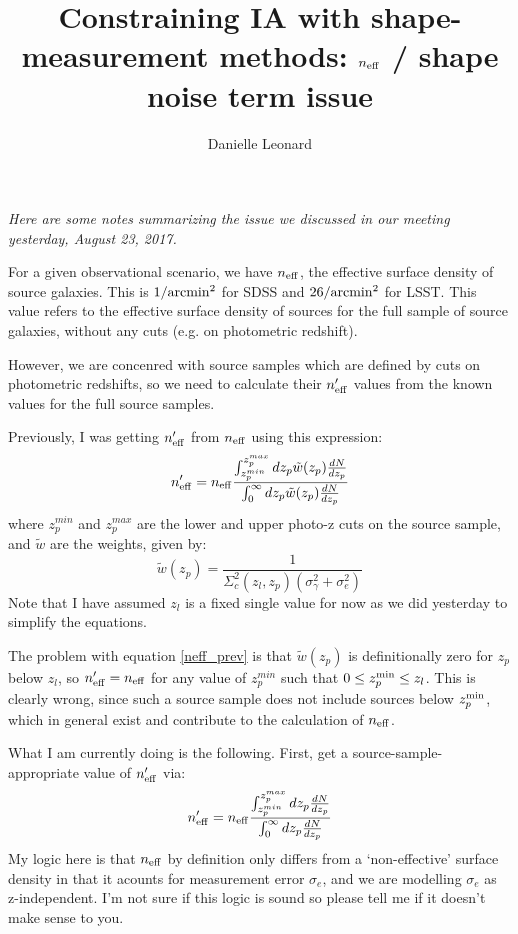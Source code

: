 \documentclass[onecolumn,amsmath,aps,fleqn, superscriptaddress]{revtex4}
\begin{document}
\title{Constraining IA with shape-measurement methods: $n_{\rm eff}$ / shape noise term issue}

\author{Danielle Leonard}

\maketitle

{\it Here are some notes summarizing the issue we discussed in our meeting yesterday, August 23, 2017.}

\vspace{2mm}

For a given observational scenario, we have $n_{\rm eff}$, the effective surface density of source galaxies. This is $1/{\rm arcmin}^2$ for SDSS and $26/{\rm arcmin}^2$ for LSST. This value refers to the effective surface density of sources for the full sample of source galaxies, without any cuts (e.g. on photometric redshift).

However, we are concenred with source samples which are defined by cuts on photometric redshifts, so we need to calculate their $n_{\rm eff}^\prime$ values from the known values for the full source samples.

Previously, I was getting $n_{\rm eff}^\prime$ from $n_{\rm eff}$ using this expression:
\begin{equation}
n_{\rm eff}^\prime = n_{\rm eff} \frac{\int_{z_p^{min}}^{z_p^{max}} dz_p \tilde{w}(z_p) \frac{dN}{dz_p}}{\int_{0}^{\infty} dz_p \tilde{w}(z_p) \frac{dN}{dz_p}}
\label{neff_prev}
\end{equation} 
where $z_p^{min}$ and $z_p^{max}$ are the lower and upper photo-z cuts on the source sample, and $\tilde{w}$ are the weights, given by:
\begin{equation}
\tilde{w}(z_p) = \frac{1}{\Sigma_c^2(z_l, z_p)(\sigma_\gamma^2 + \sigma_e^2)}
\label{weights}
\end{equation}
Note that I have assumed $z_l$ is a fixed single value for now as we did yesterday to simplify the equations.

The problem with equation \ref{neff_prev} is that $\tilde{w}(z_p)$ is definitionally zero for $z_p$ below $z_l$, so 
$n_{\rm eff}^\prime = n_{\rm eff}$ for any value of $z_p^{min}$ such that $0\le z_p^{\rm min}\le z_l$. This is clearly wrong, since such a source sample does not include sources below $z_p^{\rm min}$, which in general exist and contribute to the calculation of $n_{\rm eff}$.

What I am currently doing is the following. First, get a source-sample-appropriate value of $n_{\rm eff}^\prime$ via:
\begin{equation}
n_{\rm eff}^\prime = n_{\rm eff} \frac{\int_{z_p^{min}}^{z_p^{max}} dz_p \frac{dN}{dz_p}}{\int_{0}^{\infty} dz_p \frac{dN}{dz_p}}
\end{equation}
My logic here is that $n_{\rm eff}$ by definition only differs from a `non-effective' surface density in that it acounts for measurement error $\sigma_e$, and we are modelling $\sigma_e$ as z-independent. I'm not sure if this logic is sound so please tell me if it doesn't make sense to you.
\end{document}
